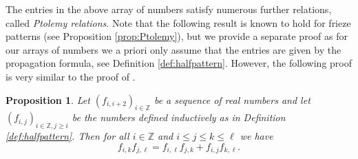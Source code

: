 \documentclass[11pt,a4paper]{amsart}
\newtheorem{Proposition}[Lemma]{Proposition}
\theoremstyle{definition}
\numberwithin{equation}{section}
\begin{document}
The entries in the above array of numbers satisfy
numerous further relations, called {\em Ptolemy
relations}. Note that the following result is known
to hold for frieze patterns (see
Proposition \ref{prop:Ptolemy}), 
but we provide a 
separate proof as for our arrays of numbers we a 
priori only assume that the entries are given by 
the propagation formula, see Definition 
\ref{def:halfpattern}. However, the following proof 
is very similar to the proof of 
\cite[Proposition 3.3]{CHJ20}.

\begin{Proposition} \label{prop:infinitePtolemy}
Let $(f_{i,i+2})_{i\in \mathbb{Z}}$ be a sequence
of real numbers and let 
$(f_{i,j})_{i\in \mathbb{Z},j\ge i}$ be the 
numbers defined inductively as in Definition 
\ref{def:halfpattern}. Then for all 
$i\in \mathbb{Z}$ and 
$i\le j\le k\le\ell$
we have 
$$f_{i,k}f_{j,\ell} = f_{i,\ell}f_{j,k} + 
f_{i,j}f_{k,\ell}.
$$
\end{Proposition}
\end{document}
